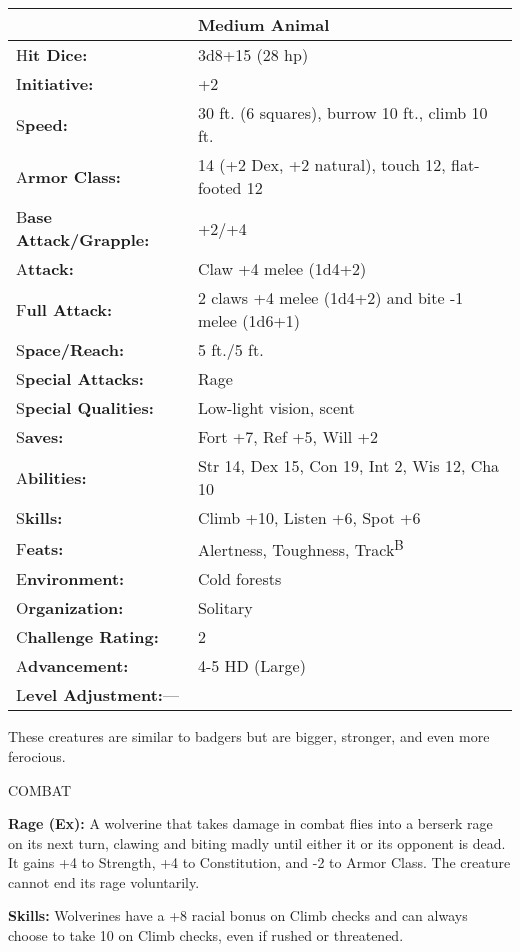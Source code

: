 \documentclass{article}
\begin{document}
\begin{tabular}{|>{\raggedright}p{91pt}|>{\raggedright}p{211pt}|}
\hline
  & Medium Animal\tabularnewline
\hline
H\textbf{it Dice:} & 3d8+15 (28 hp)\tabularnewline
\hline
I\textbf{nitiative:} & +2\tabularnewline
\hline
S\textbf{peed:} & 30 ft. (6 squares), burrow 10 ft., climb 10 ft.\tabularnewline
\hline
A\textbf{rmor Class:} & 14 (+2 Dex, +2 natural), touch 12, flat-footed 12\tabularnewline
\hline
B\textbf{ase Attack/Grapple:} & +2/+4\tabularnewline
\hline
A\textbf{ttack:} & Claw +4 melee (1d4+2)\tabularnewline
\hline
F\textbf{ull Attack:} & 2 claws +4 melee (1d4+2) and bite -1 melee (1d6+1)\tabularnewline
\hline
S\textbf{pace/Reach:} & 5 ft./5 ft.\tabularnewline
\hline
S\textbf{pecial Attacks:} & Rage\tabularnewline
\hline
S\textbf{pecial Qualities:} & Low-light vision, scent\tabularnewline
\hline
S\textbf{aves:} & Fort +7, Ref +5, Will +2\tabularnewline
\hline
A\textbf{bilities:} & Str 14, Dex 15, Con 19, Int 2, Wis 12, Cha 10\tabularnewline
\hline
S\textbf{kills:} & Climb +10, Listen +6, Spot +6\tabularnewline
\hline
F\textbf{eats:} & Alertness, Toughness, Track\textsuperscript{B}\tabularnewline
\hline
E\textbf{nvironment:} & Cold forests\tabularnewline
\hline
O\textbf{rganization:} & Solitary\tabularnewline
\hline
C\textbf{hallenge Rating:} & 2\tabularnewline
\hline
A\textbf{dvancement:} & 4-5 HD (Large)\tabularnewline
\hline
L\textbf{evel Adjustment:}--- & \tabularnewline
\hline
\end{tabular}

These creatures are similar to badgers but are bigger, stronger, and even more 
ferocious.

COMBAT

\textbf{Rage (Ex): }A wolverine that takes damage in combat flies into a berserk 
rage on its next turn, clawing and biting madly until either it or its opponent 
is dead. It gains +4 to Strength, +4 to Constitution, and -2 to Armor Class. The 
creature cannot end its rage voluntarily.

\textbf{Skills:} Wolverines have a +8 racial bonus on Climb checks and can always 
choose to take 10 on Climb checks, even if rushed or threatened.

\newpage
\end{document}
